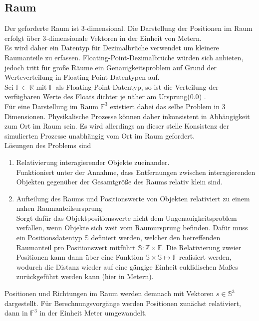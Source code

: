\subsection{Raum}
Der geforderte Raum ist 3-dimensional. Die Darstellung der Positionen im Raum erfolgt über 3-dimensionale Vektoren in der Einheit von Metern.\\
Es wird daher ein Datentyp für Dezimalbrüche verwendet um kleinere Raumanteile zu erfassen.
Floating-Point-Dezimalbrüche würden sich anbieten, jedoch tritt für große Räume ein Genauigkeitsproblem auf Grund der Werteverteilung in Floating-Point Datentypen auf.\\
Sei $\mathbb{F} \subset \mathbb{R}$ mit $\mathbb{F}$ als Floating-Point-Datentyp, so ist die Verteilung der verfügbaren Werte des Floats dichter je näher am Ursprung($0.0$) \cite{floatdistribution}.\\
Für eine Darstellung im Raum $\mathbb{F}^3$ existiert dabei das selbe Problem in 3 Dimensionen. Physikalische Prozesse können daher inkonsistent in Abhängigkeit zum Ort im Raum sein.
Es wird allerdings an dieser stelle Konsistenz der simulierten Prozesse unabhängig vom Ort im Raum gefordert.\\
Lösungen des Problems sind
\begin{enumerate}
	\item Relativierung interagierender Objekte zueinander.\\
		Funktioniert unter der Annahme, dass Entfernungen zwischen interagierenden Objekten gegenüber der Gesamtgröße des Raums relativ klein sind.
	\item Aufteilung des Raums und Positionswerte von Objekten relativiert zu einem nahen Raumanteilsursprung\\
		Sorgt dafür das Objektpositionswerte nicht dem Ungenauigkeitsproblem verfallen, wenn Objekte sich weit vom Raumursprung befinden. Dafür muss ein Positionsdatentyp $\mathbb{S}$ definiert werden, welcher den betreffenden Raumanteil pro Positionswert mitführt $\mathbb{S}:\mathbb{Z}\times\mathbb{F}$. Die Relativierung zweier Positionen kann dann über eine Funktion $ \mathbb{S}\times \mathbb{S} \mapsto \mathbb{F}$ realisiert werden, wodurch die Distanz wieder auf eine gängige Einheit euklidischen Maßes zurückgeführt werden kann (hier in Metern).
\end{enumerate}

Positionen und Richtungen im Raum werden demnach mit Vektoren $s\in\mathbb{S}^3$ dargestellt. Für Berechnungsvorgänge werden Positionen zunächst relativiert, dann in $\mathbb{F}^3$ in der Einheit Meter umgewandelt.

